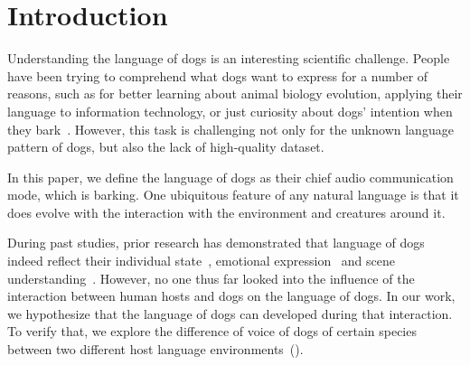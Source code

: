 \section{Introduction}


    
    


Understanding the language of dogs is an interesting scientific challenge. People have been trying to comprehend what dogs want to express for a number of reasons, such as for better learning about animal biology evolution\cite{pongracz2017modeling}, applying their language to information technology, or just curiosity about dogs' intention when they bark~\cite{pongracz2011children,dogbark_1}. However, this task is challenging not only for the unknown language pattern of dogs, but also the lack of high-quality dataset.

In this paper, we define the language of dogs as their chief audio communication mode, which is barking. One ubiquitous feature of any natural language is that it does evolve with the interaction with the environment and creatures around it\cite{arnold2018affect}. 

During past studies, prior research has demonstrated that language of dogs indeed reflect their individual state~\cite{pongracz2010barking,larranaga2015comparing}, emotional expression~\cite{thorndike2017animal,hantke2018my,paladini2020bark} and scene understanding~\cite{larranaga2015comparing, molnar2008classification}. However, no one thus far looked into the influence of the interaction between human hosts and dogs on the language of dogs. In our work, we hypothesize that the language of dogs can developed during that interaction. To verify that, we explore the difference of voice of dogs of certain species between two different host language environments~().

